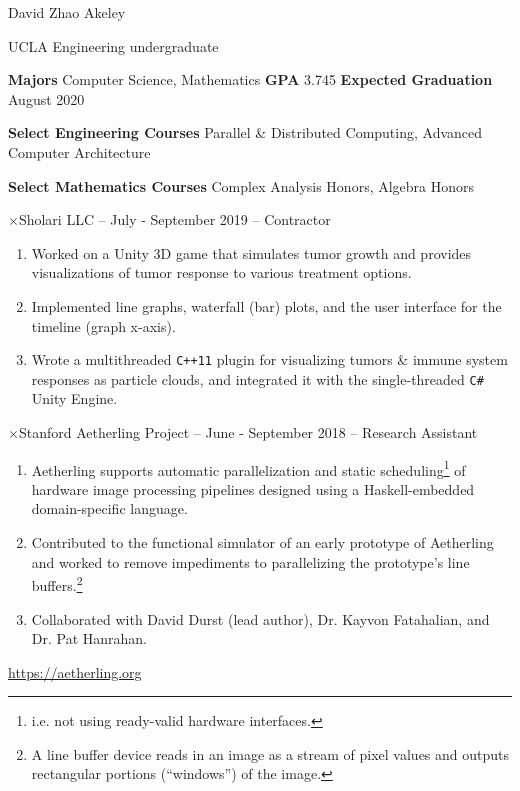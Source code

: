 \documentclass[11pt]{article}
\newcommand{\web}[1]{{ \color{webColor} \small \url{#1}}}
\newcommand{\myTitle}[1]{\vspace{2mm}{ \LARGE \color{titleColor} \textsf{#1}\vspace{2mm}}}
\newcommand{\mySub}[1]{{\color{subColor}$\times$\hspace{1mm}\textsf{#1}}}
\newcommand{\myKey}[1]{{\color{keyColor}\textbf{#1}}}
\begin{document}
\begin{center}
\myTitle{Resum\'e}

{ \color{subColor} \textsf{David Zhao Akeley}

\textsf{UCLA Engineering undergraduate} }
\end{center}


\myKey{Majors} Computer Science, Mathematics
\hfill \myKey{GPA} 3.745 %
\hfill \myKey{Expected Graduation} August 2020

\myKey{Select Engineering Courses} Parallel \& Distributed Computing,
Advanced Computer Architecture

\myKey{Select Mathematics Courses} Complex Analysis Honors, Algebra Honors

\myTitle{Work Experience}

\mySub{Sholari LLC -- July - September 2019 -- Contractor}
\begin{enumerate}
\item Worked on a Unity 3D game that simulates tumor growth and
  provides visualizations of tumor response to various treatment
  options.
\item Implemented line graphs, waterfall (bar) plots, and the user
  interface for the timeline (graph x-axis).
\item Wrote a multithreaded \texttt{C++11} plugin for visualizing
  tumors \& immune system responses as particle clouds, and integrated
  it with the single-threaded \texttt{C\#} Unity Engine.
\end{enumerate}

\mySub{Stanford Aetherling Project -- June - September 2018 --
  Research Assistant}
\begin{enumerate}
\item Aetherling supports automatic parallelization and static
  scheduling\footnote{i.e. not using ready-valid hardware interfaces.}
  of hardware image processing pipelines designed using a
  Haskell-embedded domain-specific language.
\item Contributed to the functional simulator of an early prototype of
  Aetherling and worked to remove impediments to parallelizing the
  prototype's line buffers.\footnote{A line buffer device reads in an
    image as a stream of pixel values and outputs rectangular portions
    (``windows'') of the image.}
\item Collaborated with David Durst (lead author), Dr. Kayvon
  Fatahalian, and Dr. Pat Hanrahan.
\end{enumerate}
\web{https://aetherling.org}
\end{document}

